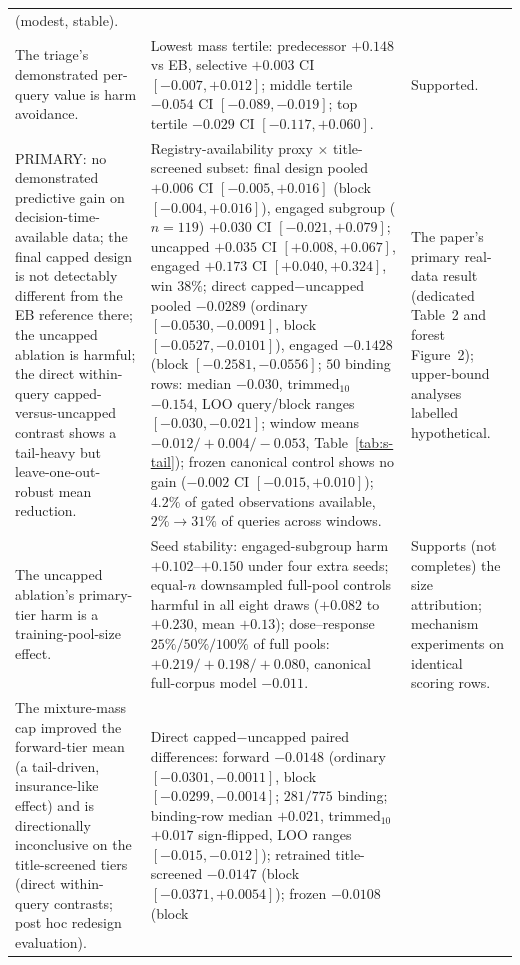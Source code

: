 \documentclass[11pt]{article}
\begin{document}
\begin{longtable}{p{} p{} p{}}
(modest, stable). \\
The triage's demonstrated per-query value is harm avoidance. & Lowest mass
tertile: predecessor $+0.148$ vs EB, selective $+0.003$ CI $[-0.007,+0.012]$;
middle tertile $-0.054$ CI $[-0.089,-0.019]$; top tertile $-0.029$ CI
$[-0.117,+0.060]$. & Supported. \\
PRIMARY: no demonstrated predictive gain on decision-time-available
data; the final
capped design is not detectably different from the EB reference there;
the uncapped ablation is harmful; the direct within-query
capped-versus-uncapped contrast shows a tail-heavy but
leave-one-out-robust mean reduction. &
Registry-availability proxy $\times$ title-screened subset: final design
pooled $+0.006$ CI $[-0.005,+0.016]$ (block $[-0.004,+0.016]$), engaged
subgroup ($n=119$) $+0.030$ CI $[-0.021,+0.079]$; uncapped $+0.035$ CI
$[+0.008,+0.067]$, engaged $+0.173$ CI $[+0.040,+0.324]$, win $38\%$;
direct capped$-$uncapped pooled $-0.0289$ (ordinary
$[-0.0530,-0.0091]$, block $[-0.0527,-0.0101]$), engaged $-0.1428$
(block $[-0.2581,-0.0556]$; $50$ binding rows: median $-0.030$,
trimmed$_{10}$ $-0.154$, LOO query/block ranges $[-0.030,-0.021]$;
window means $-0.012/+0.004/-0.053$, Table~\ref{tab:s-tail});
frozen canonical control shows no gain ($-0.002$ CI $[-0.015,+0.010]$);
$4.2\%$
of gated observations available, $2\%\to31\%$ of queries across windows. &
The paper's primary real-data result (dedicated Table~2 and forest
Figure~2); upper-bound analyses labelled hypothetical. \\
The uncapped ablation's primary-tier harm is a training-pool-size effect. &
Seed stability: engaged-subgroup harm $+0.102$--$+0.150$ under four extra
seeds; equal-$n$ downsampled full-pool controls harmful in all eight draws
($+0.082$ to $+0.230$, mean $+0.13$); dose--response $25\%/50\%/100\%$ of
full pools:
$+0.219/+0.198/+0.080$, canonical full-corpus model $-0.011$. & Supports
(not completes) the size attribution; mechanism experiments on identical
scoring rows. \\
The mixture-mass cap improved the forward-tier mean (a tail-driven,
insurance-like effect) and is directionally inconclusive on the
title-screened tiers (direct
within-query contrasts; post hoc
redesign evaluation). & Direct capped$-$uncapped paired differences:
forward $-0.0148$ (ordinary $[-0.0301,-0.0011]$, block
$[-0.0299,-0.0014]$; $281/775$ binding; binding-row median $+0.021$,
trimmed$_{10}$ $+0.017$ sign-flipped, LOO ranges $[-0.015,-0.012]$);
retrained title-screened
$-0.0147$ (block $[-0.0371,+0.0054]$); frozen $-0.0108$ (block

\end{longtable}
\end{document}
